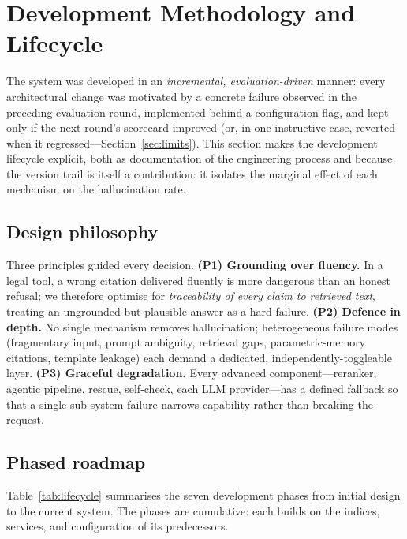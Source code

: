 \documentclass[final,1p,times]{elsarticle}
\begin{document}
\section{Development Methodology and Lifecycle}\label{sec:method}

The system was developed in an \emph{incremental, evaluation-driven} manner:
every architectural change was motivated by a concrete failure observed in the
preceding evaluation round, implemented behind a configuration flag, and kept
only if the next round's scorecard improved (or, in one instructive case,
reverted when it regressed---Section~\ref{sec:limits}). This section makes the
development lifecycle explicit, both as documentation of the engineering process
and because the version trail is itself a contribution: it isolates the marginal
effect of each mechanism on the hallucination rate.

\subsection{Design philosophy}

Three principles guided every decision. \textbf{(P1) Grounding over fluency.}
In a legal tool, a wrong citation delivered fluently is more dangerous than an
honest refusal; we therefore optimise for \emph{traceability of every claim to
retrieved text}, treating an ungrounded-but-plausible answer as a hard failure.
\textbf{(P2) Defence in depth.} No single mechanism removes hallucination;
heterogeneous failure modes (fragmentary input, prompt ambiguity, retrieval
gaps, parametric-memory citations, template leakage) each demand a dedicated,
independently-toggleable layer. \textbf{(P3) Graceful degradation.} Every
advanced component---reranker, agentic pipeline, rescue, self-check, each LLM
provider---has a defined fallback so that a single sub-system failure narrows
capability rather than breaking the request.

\subsection{Phased roadmap}

Table~\ref{tab:lifecycle} summarises the seven development phases from initial
design to the current system. The phases are cumulative: each builds on the
indices, services, and configuration of its predecessors.
\end{document}

